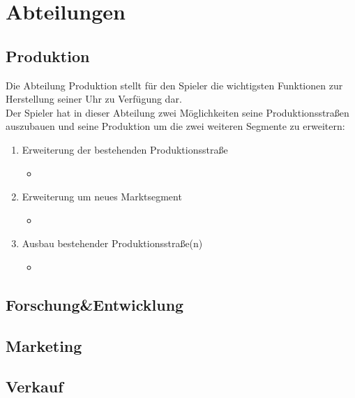 \clearpage
\chapter{Abteilungen}

\section{Produktion}
Die Abteilung Produktion stellt für den Spieler die wichtigsten Funktionen zur Herstellung seiner Uhr zu Verfügung dar.\\ 
Der Spieler hat in dieser Abteilung zwei Möglichkeiten seine Produktionsstraßen auszubauen und seine Produktion um die zwei weiteren Segmente zu erweitern:
\begin{enumerate}
	\item Erweiterung der bestehenden Produktionsstraße
\begin{itemize}
	\item  
\end{itemize}
	\item Erweiterung um neues Marktsegment
\begin{itemize}
	\item  
\end{itemize}
	\item Ausbau bestehender Produktionsstraße(n)
\begin{itemize}
	\item  
\end{itemize}
\end{enumerate}
    
\section{Forschung\&Entwicklung}

\section{Marketing}

\section{Verkauf}

